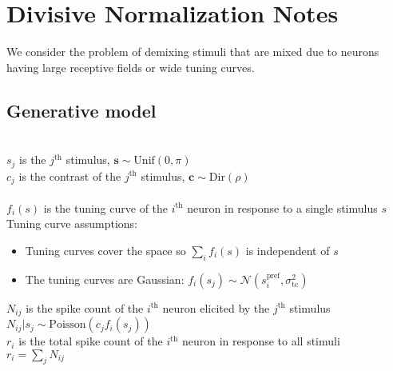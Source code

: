 \documentclass[12pt]{article}
\begin{document}
\section*{Divisive Normalization Notes}
We consider the problem of demixing stimuli that are mixed due to neurons having large receptive fields or wide tuning curves.
\subsection{Generative model}
 \\
$s_j$ is the $j^\text{th}$ stimulus, $\mathbf{s} \sim \text{Unif} (0, \pi)$\\
$c_j$ is the contrast of the $j^\text{th}$ stimulus, $\mathbf{c} \sim \text{Dir} (\rho)$\\
~\\
$f_i(s)$ is the tuning curve of the $i^\text{th}$ neuron in response to a single stimulus $s$\\
Tuning curve assumptions:
\begin{itemize}
\item Tuning curves cover the space so $\sum_i f_i(s)$ is independent of $s$
\item The tuning curves are Gaussian: $f_i(s_j) \sim \mathcal{N} (s_i^{\text{pref}}, \sigma_{\text{tc}}^2)$
\end{itemize}
$N_{ij}$ is the spike count of the $i^\text{th}$ neuron elicited by the $j^\text{th}$ stimulus\\
$N_{ij}|s_j  \sim \text{Poisson}(c_j f_i(s_j))$\\
$r_i$ is the total spike count of the $i^\text{th}$ neuron in response to all stimuli\\
$r_i = \sum_j N_{ij}$\\
\end{document}
